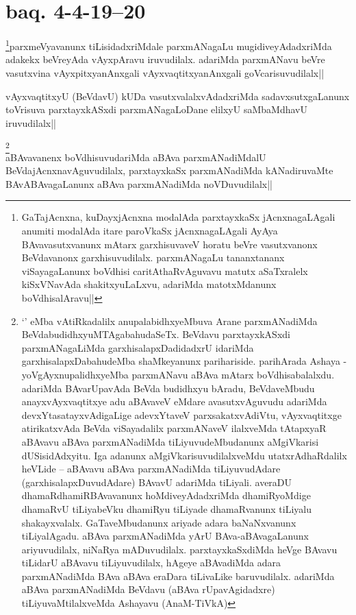 
\section*{baq. 4-4-19--20}

\begin{artha}
\footnote[1]{GaTajAcnxna, kuDayxjAcnxna modalAda parxtayxkaSx 
jAcnxnagaLAgali anumiti modalAda itare paroVkaSx jAcnxnagaLAgali AyAya 
BAvavasutxvanunx mAtarx garxhisuvaveV horatu beVre vasutxvanonx 
BeVdavanonx garxhisuvudilalx. parxmANagaLu tananxtananx viSayagaLanunx 
boVdhisi caritAthaRvAguvavu matutx aSaTxralelx kiSxVNavAda 
shakitxyuLaLxvu, adariMda matotxMdanunx boVdhisalAravu||}parxmeVyavanunx tiLisidadxriMdale parxmANagaLu mugidiveyAdadxriMda 
adakekx beVreyAda vAyxpAravu iruvudilalx. adariMda parxmANavu beVre 
vasutxvina vAyxpitxyanAnxgali vAyxvaqtitxyanAnxgali goVcarisuvudilalx||
\end{artha}

\begin{artha}
vAyxvaqtitxyU (BeVdavU) kUDa vasutxvalalxvAdadxriMda 
sadavxsutxgaLanunx toVrisuva parxtayxkASxdi parxmANagaLoDane elilxyU 
saMbaMdhavU iruvudilalx||
\end{artha}

\begin{artha} 
\footnote[2]{`\stext' eMba vAtiRkadalilx 
anupalabidhxyeMbuva Arane parxmANadiMda BeVdabudidhxyuMTAgabahudaSeTx. 
BeVdavu parxtayxkASxdi parxmANagaLiMda garxhisalapxDadidadxrU idariMda 
garxhisalapxDabahudeMba shaMkeyanunx parihariside. parihArada Ashaya - 
yoVgAyxnupalidhxyeMba parxmANavu aBAva mAtarx boVdhisabalalxdu. 
adariMda BAvarUpavAda BeVda budidhxyu bAradu, BeVdaveMbudu 
anayxvAyxvaqtitxye adu aBAvaveV eMdare avasutxvAguvudu adariMda 
devxYtasatayxvAdigaLige adevxYtaveV parxsakatxvAdiVtu, vAyxvaqtitxge 
atirikatxvAda BeVda viSayadalilx parxmANaveV ilalxveMda tAtapxyaR 
aBAvavu aBAva parxmANadiMda tiLiyuvudeMbudanunx aMgiVkarisi 
dUSisidAdxyitu. Iga adanunx aMgiVkarisuvudilalxveMdu utatxrAdhaRdalilx 
heVLide -- aBAvavu aBAva parxmANadiMda tiLiyuvudAdare 
(garxhisalapxDuvudAdare) BAvavU adariMda tiLiyali. averaDU 
dhamaRdhamiRBAvavanunx hoMdiveyAdadxriMda dhamiRyoMdige dhamaRvU 
tiLiyabeVku dhamiRyu tiLiyade dhamaRvanunx tiLiyalu shakayxvalalx. 
GaTaveMbudanunx ariyade adara baNaNxvanunx tiLiyalAgadu. aBAva 
parxmANadiMda yArU BAva-aBAvagaLanunx ariyuvudilalx, niNaRya 
mADuvudilalx. parxtayxkaSxdiMda heVge BAvavu tiLidarU aBAvavu 
tiLiyuvudilalx, hAgeye aBAvadiMda adara parxmANadiMda BAva aBAva 
eraDara tiLivaLike baruvudilalx. adariMda aBAva parxmANadiMda BeVdavu 
(aBAva rUpavAgidadxre) tiLiyuvaMtilalxveMda Ashayavu (AnaM-TiVkA)}\\
aBAvavanenx boVdhisuvudariMda aBAva parxmANadiMdalU 
BeVdajAcnxnavAguvudilalx, parxtayxkaSx parxmANadiMda kANadiruvaMte 
BAvABAvagaLanunx aBAva parxmANadiMda noVDuvudilalx||
\end{artha}

